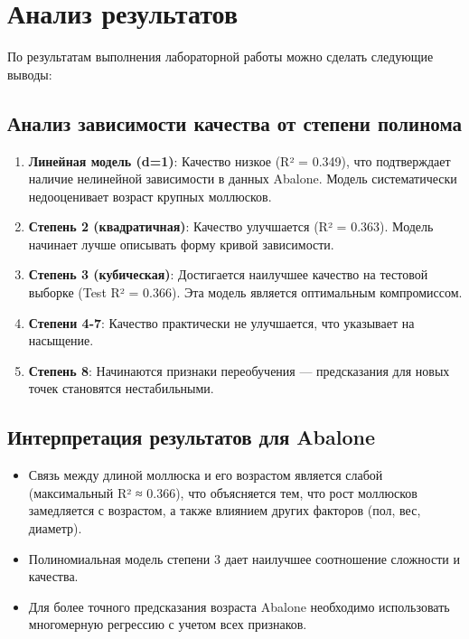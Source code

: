 \section{Анализ результатов}

По результатам выполнения лабораторной работы можно сделать следующие выводы:

\subsection{Анализ зависимости качества от степени полинома}

\begin{enumerate}
    \item \textbf{Линейная модель (d=1)}: Качество низкое (R² = 0.349), что подтверждает наличие нелинейной зависимости в данных Abalone. Модель систематически недооценивает возраст крупных моллюсков.
    
    \item \textbf{Степень 2 (квадратичная)}: Качество улучшается (R² = 0.363). Модель начинает лучше описывать форму кривой зависимости.
    
    \item \textbf{Степень 3 (кубическая)}: Достигается наилучшее качество на тестовой выборке (Test R² = 0.366). Эта модель является оптимальным компромиссом.
    
    \item \textbf{Степени 4-7}: Качество практически не улучшается, что указывает на насыщение.
    
    \item \textbf{Степень 8}: Начинаются признаки переобучения — предсказания для новых точек становятся нестабильными.
\end{enumerate}

\subsection{Интерпретация результатов для Abalone}

\begin{itemize}
    \item Связь между длиной моллюска и его возрастом является слабой (максимальный R² ≈ 0.366), что объясняется тем, что рост моллюсков замедляется с возрастом, а также влиянием других факторов (пол, вес, диаметр).
    \item Полиномиальная модель степени 3 дает наилучшее соотношение сложности и качества.
    \item Для более точного предсказания возраста Abalone необходимо использовать многомерную регрессию с учетом всех признаков.
\end{itemize}

